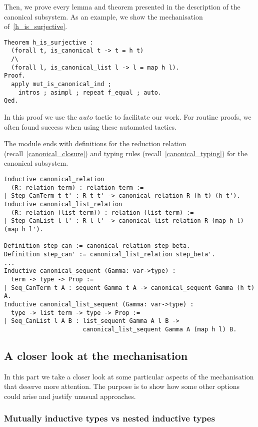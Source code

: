 Then, we prove every lemma and theorem presented in the description of the canonical subsystem.
As an example, we show the mechanisation of~\cref{h_is_surjective}.
\begin{lstlisting}[language=Coq]
Theorem h_is_surjective :
  (forall t, is_canonical t -> t = h t)
  /\
  (forall l, is_canonical_list l -> l = map h l).
Proof.
  apply mut_is_canonical_ind ;
    intros ; asimpl ; repeat f_equal ; auto.
Qed.
\end{lstlisting}
In this proof we use the \lst$auto$ tactic to facilitate our work.
For routine proofs, we often found success when using these automated tactics.

The module ends with definitions for the reduction relation (recall~\cref{canonical_closure}) and typing rules (recall~\cref{canonical_typing}) for the canonical subsystem.
\begin{lstlisting}[language=Coq]
Inductive canonical_relation
  (R: relation term) : relation term :=
| Step_CanTerm t t' : R t t' -> canonical_relation R (h t) (h t').
Inductive canonical_list_relation
  (R: relation (list term)) : relation (list term) :=
| Step_CanList l l' : R l l' -> canonical_list_relation R (map h l) (map h l').

Definition step_can := canonical_relation step_beta.
Definition step_can' := canonical_list_relation step_beta'.
...
Inductive canonical_sequent (Gamma: var->type) :
  term -> type -> Prop :=
| Seq_CanTerm t A : sequent Gamma t A -> canonical_sequent Gamma (h t) A.
Inductive canonical_list_sequent (Gamma: var->type) :
  type -> list term -> type -> Prop :=
| Seq_CanList l A B : list_sequent Gamma A l B ->
                      canonical_list_sequent Gamma A (map h l) B.
\end{lstlisting}

\subsection{A closer look at the mechanisation}

In this part we take a closer look at some particular aspects of the mechanisation that deserve more attention.
The purpose is to show how some other options could arise and justify unusual approaches.

\subsubsection{Mutually inductive types vs nested inductive types}

